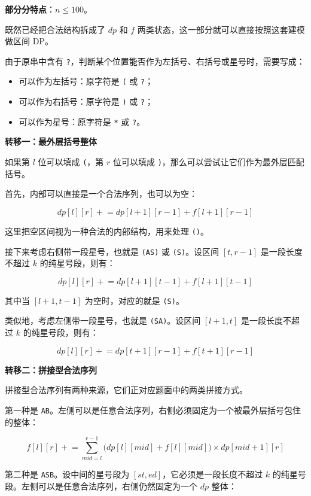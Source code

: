 \documentclass{book}
\newcommand{\code}[1]{\colorbox{codebg}{\texttt{#1}}}  %
\begin{document}
\textbf{部分分特点}：$n\le 100$。

既然已经把合法结构拆成了 $dp$ 和 $f$ 两类状态，这一部分就可以直接按照这套建模做区间 DP。

由于原串中含有 \code{?}，判断某个位置能否作为左括号、右括号或星号时，需要写成：

\begin{itemize}[leftmargin=2em,itemsep=1pt,topsep=2pt,parsep=0pt,partopsep=0pt]
    \item 可以作为左括号：原字符是 \code{(} 或 \code{?}；
    \item 可以作为右括号：原字符是 \code{)} 或 \code{?}；
    \item 可以作为星号：原字符是 \code{*} 或 \code{?}。
\end{itemize}
\newpage
\par\medskip
\noindent\textbf{转移一：最外层括号整体}
\par\medskip

如果第 $l$ 位可以填成 \code{(}，第 $r$ 位可以填成 \code{)}，那么可以尝试让它们作为最外层匹配括号。

首先，内部可以直接是一个合法序列，也可以为空：

$$
dp[l][r]\mathrel{+}=dp[l+1][r-1]+f[l+1][r-1]
$$

这里把空区间视为一种合法的内部结构，用来处理 \code{()}。

接下来考虑右侧带一段星号，也就是 \code{(AS)} 或 \code{(S)}。设区间 $[t,r-1]$ 是一段长度不超过 $k$ 的纯星号段，则有：

$$
dp[l][r]\mathrel{+}=dp[l+1][t-1]+f[l+1][t-1]
$$

其中当 $[l+1,t-1]$ 为空时，对应的就是 \code{(S)}。

类似地，考虑左侧带一段星号，也就是 \code{(SA)}。设区间 $[l+1,t]$ 是一段长度不超过 $k$ 的纯星号段，则有：

$$
dp[l][r]\mathrel{+}=dp[t+1][r-1]+f[t+1][r-1]
$$

\par\medskip
\noindent\textbf{转移二：拼接型合法序列}
\par\medskip

拼接型合法序列有两种来源，它们正对应题面中的两类拼接方式。

第一种是 \code{AB}。左侧可以是任意合法序列，右侧必须固定为一个被最外层括号包住的整体：

$$
f[l][r]\mathrel{+}=
\sum_{mid=l}^{r-1}
\bigl(dp[l][mid]+f[l][mid]\bigr)\times dp[mid+1][r]
$$

第二种是 \code{ASB}。设中间的星号段为 $[st,ed]$，它必须是一段长度不超过 $k$ 的纯星号段。左侧可以是任意合法序列，右侧仍然固定为一个 $dp$ 整体：
\end{document}
